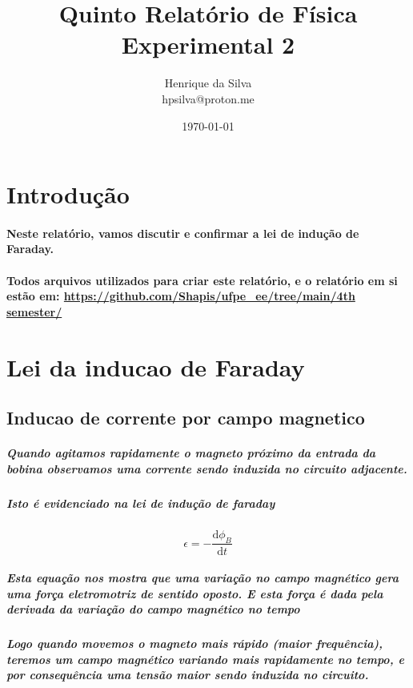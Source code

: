 \documentclass[12pt,twoside, a4paper, twocolumn]{article}
\title{Quinto Relatório de Física Experimental 2}
\author{Henrique da Silva \\ hpsilva@proton.me}
\date{\today}
\newcommand\deriv[2]{\frac{\mathrm d #1}{\mathrm d #2}}
\begin{document}
\maketitle
{}
\newpage
\tableofcontents
\newpage

\section{Introdução}

\paragraph*{Neste relatório, vamos discutir e confirmar a lei de indução de Faraday.}

\paragraph*{Todos arquivos utilizados para criar este relatório, e o relatório em si estão em:  \url{https://github.com/Shapis/ufpe_ee/tree/main/4th semester/}}


\section{Lei da inducao de Faraday}

\subsection{Inducao de corrente por campo magnetico}

\subparagraph*{Quando agitamos rapidamente o magneto próximo da entrada da bobina observamos uma corrente sendo induzida no circuito adjacente.}

\subparagraph*{Isto é evidenciado na lei de indução de faraday}

\begin{equation}
  \epsilon = - \deriv{\phi_B}{t}
\end{equation}

\subparagraph*{Esta equação nos mostra que uma variação no campo magnético gera uma força eletromotriz de sentido oposto. E esta força é dada pela derivada da variação do campo magnético no tempo}

\subparagraph*{Logo quando movemos o magneto mais rápido (maior frequência), teremos um campo magnético variando mais rapidamente no tempo, e por consequência uma tensão maior sendo induzida no circuito.}
\end{document}
